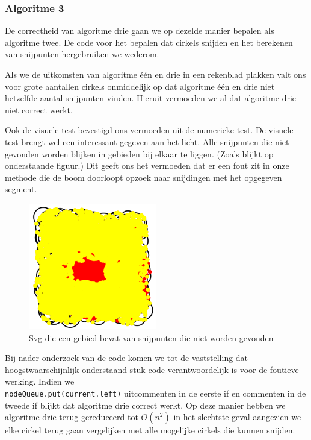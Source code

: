 \documentclass[11pt,a4paper]{article}
\begin{document}
\subsubsection*{Algoritme 3}

De correctheid van algoritme drie gaan we op dezelde manier bepalen als algoritme twee. De code voor het bepalen dat cirkels snijden en het berekenen van snijpunten hergebruiken we wederom.

Als we de uitkomsten van algoritme \'e\'en en drie in een rekenblad plakken valt ons voor grote aantallen cirkels onmiddelijk op dat algoritme \'e\'en en drie niet hetzelfde aantal snijpunten vinden. Hieruit vermoeden we al dat algoritme drie niet correct werkt.

Ook de visuele test bevestigd ons vermoeden uit de numerieke test. De visuele test brengt wel een interessant gegeven aan het licht. Alle snijpunten die niet gevonden worden blijken in gebieden bij elkaar te liggen. (Zoals blijkt op onderstaande figuur.) Dit geeft ons het vermoeden dat er een fout zit in onze methode die de boom doorloopt opzoek naar snijdingen met het opgegeven segment.

\begin{figure}[H]
\centering
\includegraphics[width=0.5\textwidth]{gat_midden.png}
\caption*{Svg die een gebied bevat van snijpunten die niet worden gevonden}
\end{figure}

Bij nader onderzoek van de code komen we tot de vaststelling dat hoogstwaarschijnlijk onderstaand stuk code verantwoordelijk is voor de foutieve werking. Indien we \\ \verb|nodeQueue.put(current.left)| uitcommenten in de eerste if en commenten in de tweede if blijkt dat algoritme drie correct werkt. Op deze manier hebben we algoritme drie terug gereduceerd tot $O(n^{2})$ in het slechtste geval aangezien we elke cirkel terug gaan vergelijken met alle mogelijke cirkels die kunnen snijden.
\end{document}
